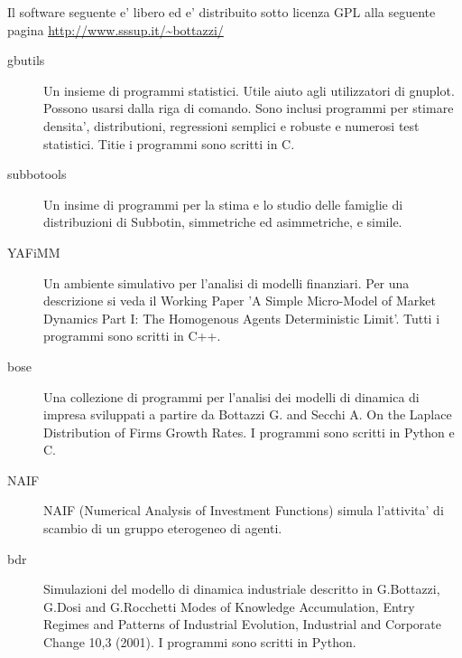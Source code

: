 \documentclass[a4paper]{article}
\begin{document}
Il software seguente e' libero ed e' distribuito sotto licenza GPL
alla seguente pagina \url{http://www.sssup.it/~bottazzi/}
%
\begin{description}
\item[{gbutils}] \leavevmode 
Un insieme di programmi statistici. Utile aiuto agli utilizzatori di
gnuplot. Possono usarsi dalla riga di comando. Sono inclusi programmi
per stimare densita', distributioni, regressioni semplici e robuste e
numerosi test statistici. Titie i programmi sono scritti in C.

\item[{subbotools}] \leavevmode 
Un insime di programmi per la stima e lo studio delle famiglie di
distribuzioni di Subbotin, simmetriche ed asimmetriche, e simile.

\item[{YAFiMM}] \leavevmode 
Un ambiente simulativo per l'analisi di modelli finanziari. Per una
descrizione si veda il Working Paper 'A Simple Micro-Model of Market
Dynamics Part I: The Homogenous Agents Deterministic Limit'. Tutti i
programmi sono scritti in C++.

\item[{bose}] \leavevmode 
Una collezione di programmi per l'analisi dei modelli di dinamica di
impresa sviluppati a partire da Bottazzi G. and Secchi A. On the
Laplace Distribution of Firms Growth Rates. I programmi sono scritti
in Python e C.

\item[{NAIF}] \leavevmode 
NAIF (Numerical Analysis of Investment Functions) simula l'attivita'
di scambio di un gruppo eterogeneo di agenti.

\item[{bdr}] \leavevmode 
Simulazioni del modello di dinamica industriale descritto in
G.Bottazzi, G.Dosi and G.Rocchetti Modes of Knowledge Accumulation,
Entry Regimes and Patterns of Industrial Evolution, Industrial and
Corporate Change 10,3 (2001). I programmi sono scritti in Python.

\end{description}
\end{document}
